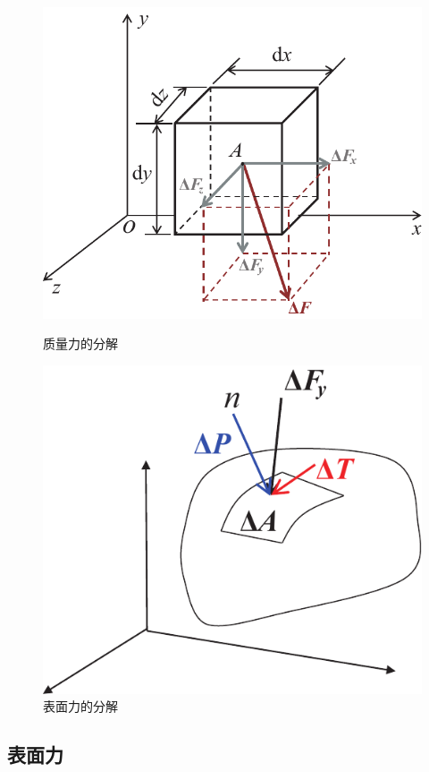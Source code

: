 \begin{figure}[!htb]
	\centering
	\begin{minipage}{0.45 \linewidth}
		\centering
		\includegraphics[width=\linewidth]{pic/质量力.pdf}
		\caption{质量力的分解}
		\label{质量力}
	\end{minipage}
	\begin{minipage}{0.45 \linewidth}
		\centering
		\includegraphics[width=0.8\linewidth]{pic/表面力.pdf}
		\vspace*{2.6em}
		\caption{表面力的分解}
		\label{表面力}
	\end{minipage}
\end{figure}

\subsection{表面力}
\vspace*{-1em}

